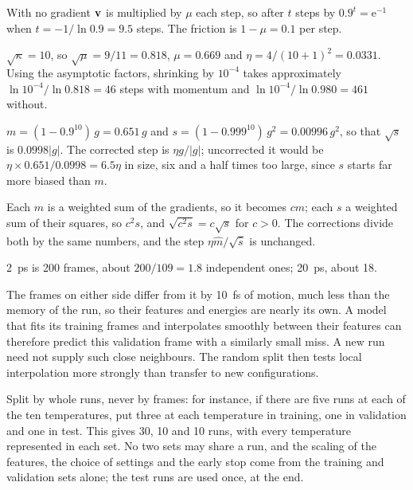 With no gradient $\bm{\mathrm{v}}$ is multiplied by $\mu$
each step, so after $t$ steps by $0.9^t = \mathrm{e}^{-1}$ when $t =
-1/\ln0.9 = 9.5$ steps. The friction is $1 - \mu = 0.1$ per step.

$\sqrt\kappa = 10$, so $\sqrt\mu = 9/11 = 0.818$,
$\mu = 0.669$ and $\eta = 4/(10 + 1)^2 = 0.0331$. Using the asymptotic factors, shrinking by $10^{-4}$
takes approximately $\ln10^{-4}/\ln0.818 = 46$ steps with momentum and $\ln10^{-4}/
\ln0.980 = 461$ without.

$m = (1 - 0.9^{10})\,g = 0.651\,g$ and $s = (1 -
0.999^{10})\,g^2 = 0.00996\,g^2$, so that $\sqrt s$ is
$0.0998\lvert g\rvert$. The corrected step is $\eta g/\lvert g\rvert$; uncorrected it would be
$\eta\times0.651/0.0998 = 6.5\eta$ in size, six and a half times too
large, since $s$ starts far more biased than $m$.

Each $m$ is a weighted sum of the gradients, so
it becomes $cm$; each $s$ a weighted sum of their squares, so $c^2s$, and
$\sqrt{c^2s} = c\sqrt s$ for $c > 0$. The corrections divide both by the
same numbers, and the step $\eta\hat m/\sqrt{\hat s}$ is unchanged.

\SI{2}{\pico\second} is 200 frames, about $200/
109 = 1.8$ independent ones; \SI{20}{\pico\second}, about 18.

The frames on either side differ from it by
\SI{10}{\femto\second} of motion, much less than the memory of the run,
so their features and energies are nearly its own. A model that fits its
training frames and interpolates smoothly between their features can
therefore predict this validation frame with a similarly small miss.
A new run need not supply such close neighbours. The random split then
tests local interpolation more strongly than transfer to new configurations.

Split by whole runs, never by frames: for
instance, if there are five runs at each of the ten temperatures, put
three at each temperature in training, one in validation and one in test.
This gives 30, 10 and 10 runs, with every temperature represented in each set. No two sets may share a run,
and the scaling of the features, the choice of settings and the early
stop come from the training and validation sets alone; the test runs are
used once, at the end.
